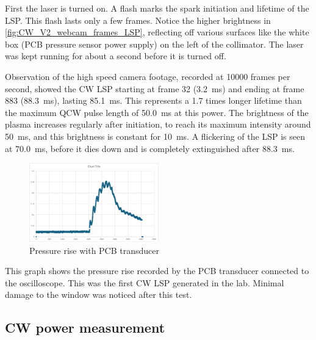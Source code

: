             

            First the laser is turned on. A flash marks the spark initiation and lifetime of the LSP. This flash lasts only a few frames. Notice the higher brightness in \autoref{fig:CW_V2_webcam_frames_LSP}, reflecting off various surfaces like the white box (PCB pressure sensor power supply) on the left of the collimator. The laser was kept running for about a second before it is turned off.

            

            Observation of the high speed camera footage, recorded at 10000 frames per second, showed the CW LSP starting at frame 32 (\qty{3.2}{ms}) and ending at frame 883 (\qty{88.3}{ms}), lasting \qty{85.1}{ms}. This represents a 1.7 times longer lifetime than the maximum QCW pulse length of \qty{50.0}{ms} at this power. The brightness of the plasma increases regularly after initiation, to reach its maximum intensity around \qty{50}{ms}, and this brightness is constant for \qty{10}{ms}. A flickering of the LSP is seen at \qty{70.0}{ms}, before it dies down and is completely extinguished after \qty{88.3}{ms}.

            \begin{figure}[!ht]
                \centering
                \includegraphics[width=0.5\textwidth]{assets/4 experiments/CW pressure rise.png}
                \caption{Pressure rise with PCB transducer}
            \end{figure}

            This graph shows the pressure rise recorded by the PCB transducer connected to the oscilloscope. This was the first CW LSP generated in the lab.  Minimal damage to the window was noticed after this test.

        \subsection{CW power measurement}

